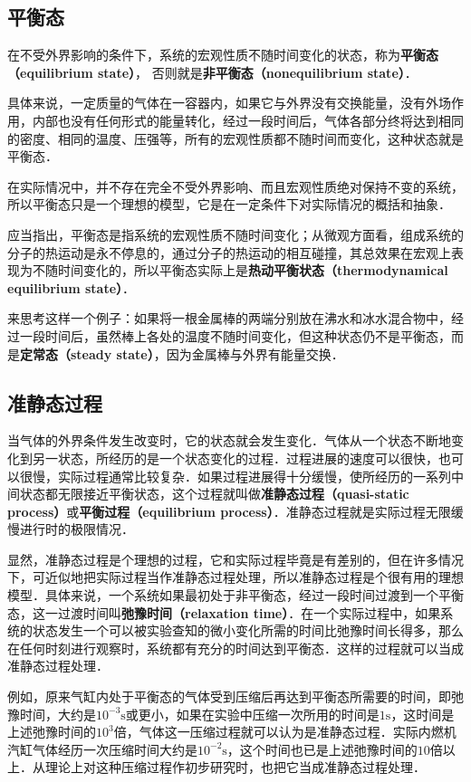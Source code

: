 
\subsection{平衡态}

在不受外界影响的条件下，系统的宏观性质不随时间变化的状态，称为\textbf{平衡态（equilibrium state）}， 否则就是\textbf{非平衡态（nonequilibrium state）}．

具体来说，一定质量的气体在一容器内，如果它与外界没有交换能量，没有外场作用，内部也没有任何形式的能量转化，经过一段时间后，气体各部分终将达到相同的密度、相同的温度、压强等，所有的宏观性质都不随时间而变化，这种状态就是平衡态．

在实际情况中，并不存在完全不受外界影响、而且宏观性质绝对保持不变的系统，所以平衡态只是一个理想的模型，它是在一定条件下对实际情况的概括和抽象．

应当指出，平衡态是指系统的宏观性质不随时间变化；从微观方面看，组成系统的分子的热运动是永不停息的，通过分子的热运动的相互碰撞，其总效果在宏观上表现为不随时间变化的，所以平衡态实际上是\textbf{热动平衡状态（thermodynamical equilibrium state）}．

来思考这样一个例子：如果将一根金属棒的两端分别放在沸水和冰水混合物中，经过一段时间后，虽然棒上各处的温度不随时间变化，但这种状态仍不是平衡态，而是\textbf{定常态（steady state）}，因为金属棒与外界有能量交换．

\subsection{准静态过程}

当气体的外界条件发生改变时，它的状态就会发生变化．气体从一个状态不断地变化到另一状态，所经历的是一个状态变化的过程．过程进展的速度可以很快，也可以很慢，实际过程通常比较复杂．如果过程进展得十分缓慢，使所经历的一系列中间状态都无限接近平衡状态，这个过程就叫做\textbf{准静态过程（quasi-static process）}或\textbf{平衡过程（equilibrium process）}．准静态过程就是实际过程无限缓慢进行时的极限情况．

显然，准静态过程是个理想的过程，它和实际过程毕竟是有差别的，但在许多情况下，可近似地把实际过程当作准静态过程处理，所以准静态过程是个很有用的理想模型．具体来说，一个系统如果最初处于非平衡态，经过一段时间过渡到一个平衡态，这一过渡时间叫\textbf{弛豫时间（relaxation time）}．在一个实际过程中，如果系统的状态发生一个可以被实验查知的微小变化所需的时间比弛豫时间长得多，那么在任何时刻进行观察时，系统都有充分的时间达到平衡态．这样的过程就可以当成准静态过程处理．

例如，原来气缸内处于平衡态的气体受到压缩后再达到平衡态所需要的时间，即弛豫时间，大约是$10^{-3}\mathrm s$或更小，如果在实验中压缩一次所用的时间是$1\mathrm s$，这时间是上述弛豫时间的$10^3$倍，气体这一压缩过程就可以认为是准静态过程．实际内燃机汽缸气体经历一次压缩时间大约是$10^{-2}\mathrm s$，这个时间也已是上述弛豫时间的$10$倍以上．从理论上对这种压缩过程作初步研究时，也把它当成准静态过程处理．

